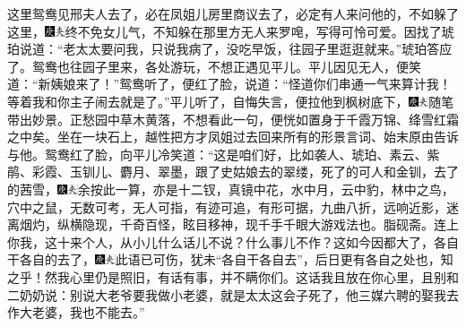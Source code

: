 这里鸳鸯见邢夫人去了，必在凤姐儿房里商议去了，必定有人来问他的，不如躲了这里，{\includegraphics[width=3mm]{../Images/00004}\includegraphics[width=3mm]{../Images/00012}\footnotesize \kaishu 终不免女儿气，不知躲在那里方无人来罗唣，写得可怜可爱。}因找了琥珀说道：“老太太要问我，只说我病了，没吃早饭，往园子里逛逛就来。”琥珀答应了。鸳鸯也往园子里来，各处游玩，不想正遇见平儿。平儿因见无人，便笑道：“新姨娘来了！”鸳鸯听了，便红了脸，说道：“怪道你们串通一气来算计我！等着我和你主子闹去就是了。”平儿听了，自悔失言，便拉他到枫树底下，{\includegraphics[width=3mm]{../Images/00004}\includegraphics[width=3mm]{../Images/00012}\footnotesize \kaishu 随笔带出妙景。正愁园中草木黄落，不想看此一句，便恍如置身于千霞万锦、绛雪红霜之中矣。}坐在一块石上，越性把方才凤姐过去回来所有的形景言词、始末原由告诉与他。鸳鸯红了脸，向平儿冷笑道：“这是咱们好，比如袭人、琥珀、素云、紫鹃、彩霞、玉钏儿、麝月、翠墨，跟了史姑娘去的翠缕，死了的可人和金钏，去了的茜雪，{\includegraphics[width=3mm]{../Images/00004}\includegraphics[width=3mm]{../Images/00012}\footnotesize \kaishu 余按此一算，亦是十二钗，真镜中花，水中月，云中豹，林中之鸟，穴中之鼠，无数可考，无人可指，有迹可追，有形可据，九曲八折，远响近影，迷离烟灼，纵横隐现，千奇百怪，眩目移神，现千手千眼大游戏法也。脂砚斋。}连上你我，这十来个人，从小儿什么话儿不说？什么事儿不作？这如今因都大了，各自干各自的去了，{\includegraphics[width=3mm]{../Images/00004}\includegraphics[width=3mm]{../Images/00012}\footnotesize \kaishu 此语已可伤，犹未“各自干各自去”，后日更有各自之处也，知之乎！}然我心里仍是照旧，有话有事，并不瞒你们。这话我且放在你心里，且别和二奶奶说：别说大老爷要我做小老婆，就是太太这会子死了，他三媒六聘的娶我去作大老婆，我也不能去。”

